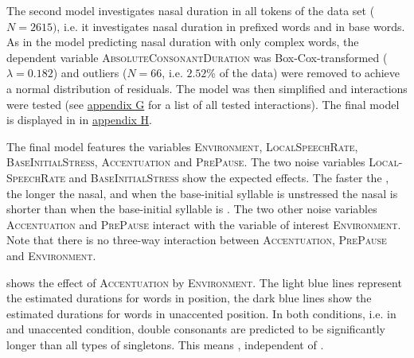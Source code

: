 The second model investigates nasal duration in all tokens of the data set ($N=2615)$, i.e. it investigates nasal duration in prefixed words and in base words. 
As in the model predicting nasal duration with only complex words, the dependent variable \textsc{AbsoluteConsonantDuration} was Box-Cox-transformed ($\lambda= 0.182$) and outliers ($N=66$, i.e. $ 2.52$\% of the data) were removed to achieve a normal distribution of residuals. The model was then simplified and interactions were tested (see \hyperref[Appendix G Summaries of tested interactions in experimental study]{appendix G} for a list of all tested interactions). The final model is displayed in  in \hyperref[Appendix H: Model Summaries Experiment]{appendix H}.


The final model features the variables \textsc{Environment}, \textsc{LocalSpeechRate}, \textsc{BaseInitialStress}, \textsc{Accentuation} and \textsc{PrePause}.
The two noise variables \textsc{Local-SpeechRate} and \textsc{BaseInitialStress} show the expected effects. The faster the , the longer the nasal, and when the base-initial syllable is unstressed the nasal is shorter than when the base-initial syllable is .
The two other noise variables \textsc{Accentuation} and \textsc{PrePause} interact with the variable of interest \textsc{Environment}. Note that there is no three-way interaction between  \textsc{Accentuation}, \textsc{PrePause} and \textsc{Environment}.

 shows the effect of \textsc{Accentuation} by \textsc{Environment}. The light blue lines represent the estimated durations for words  in  position, the dark blue lines show the estimated durations for words in unaccented position. In both conditions, i.e. in  and unaccented condition, double consonants are predicted to be significantly longer than all types of singletons. This means  , independent of .

